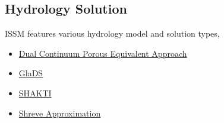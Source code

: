 
\subsection{Hydrology Solution} \label{sec:using-issm-capabilities-hydrology}
ISSM features various hydrology model and solution types,
\begin{itemize}
	\item \hyperref[sec:using-issm-capabilities-hydrology-dc]{Dual Continuum Porous Equivalent Approach}
	\item \hyperref[sec:using-issm-capabilities-hydrology-glads]{GlaDS}
	\item \hyperref[sec:using-issm-capabilities-hydrology-shakti]{SHAKTI}
	\item \hyperref[sec:using-issm-capabilities-hydrology-shreve]{Shreve Approximation}
\end{itemize}

\clearpage %
